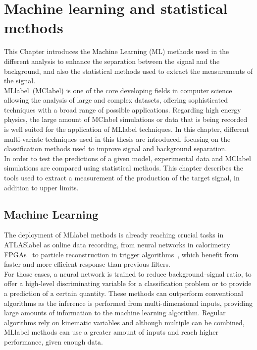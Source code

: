 \chapter{Machine learning and statistical methods}
\label{chapter:MLStat}

This Chapter introduces the Machine Learning (ML) methods used in the different analysis to enhance the separation between the signal and the background, and also the statistical methods used to extract the measurements of the signal.\\

\acrlong{MLlabel}~(\acrshort{MClabel}) is one of the core developing fields in computer science allowing the analysis of large and complex datasets, offering sophisticated techniques with a broad range of possible applications. Regarding high energy physics, the large amount of \acrshort{MClabel} simulations or data that is being recorded is well suited for the application of \acrshort{MLlabel} techniques. In this chapter, different multi-variate techniques used in this thesis are introduced, focusing on the classification methods used to improve signal and background separation.\\

In order to test the predictions of a given model, experimental data and \acrshort{MClabel} simulations are compared using statistical methods. This chapter describes the tools used to extract a measurement of the production of the target signal, in addition to upper limits.

\section{Machine Learning}

The deployment of \acrshort{MLlabel} methods is already reaching crucial tasks in \acrshort{ATLASlabel} as online data recording, from neural networks in calorimetry FPGAs~\cite{Laatu:2022fni} to particle reconstruction in trigger algorithms~\cite{ATLAS:2019uhp}, which benefit from faster and more efficient response than previous filters.\\

For those cases, a neural network is trained to reduce background--signal ratio, to offer a high-level discriminating variable for a classification problem or to provide a prediction of a certain quantity. These methods can outperform conventional algorithms as the inference is performed from multi-dimensional inputs, providing large amounts of information to the machine learning algorithm. Regular algorithms rely on kinematic variables and although multiple can be combined, \acrshort{MLlabel} methods can use a greater amount of inputs and reach higher performance, given enough data.\\

